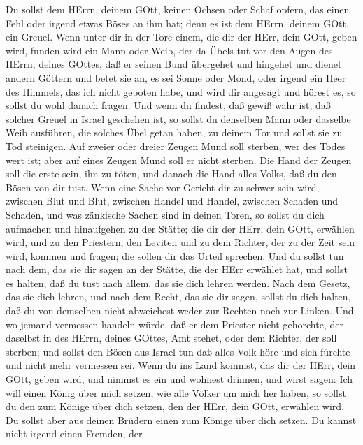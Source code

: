  Du sollst dem HErrn, deinem GOtt, keinen Ochsen oder Schaf
opfern, das einen Fehl oder irgend etwas Böses an ihm hat; denn es ist
dem HErrn, deinem GOtt, ein Greuel.  Wenn unter dir in der
Tore einem, die dir der HErr, dein GOtt, geben wird, funden wird ein
Mann oder Weib, der da Übels tut vor den Augen des HErrn, deines GOttes,
daß er seinen Bund übergehet  und hingehet und dienet andern
Göttern und betet sie an, es sei Sonne oder Mond, oder irgend ein Heer
des Himmels, das ich nicht geboten habe,  und wird dir
angesagt und hörest es, so sollst du wohl danach fragen. Und wenn du
findest, daß gewiß wahr ist, daß solcher Greuel in Israel geschehen ist,
 so sollst du denselben Mann oder dasselbe Weib ausführen,
die solches Übel getan haben, zu deinem Tor und sollst sie zu Tod
steinigen.  Auf zweier oder dreier Zeugen Mund soll sterben,
wer des Todes wert ist; aber auf eines Zeugen Mund soll er nicht
sterben.  Die Hand der Zeugen soll die erste sein, ihn zu
töten, und danach die Hand alles Volks, daß du den Bösen von dir tust.
 Wenn eine Sache vor Gericht dir zu schwer sein wird,
zwischen Blut und Blut, zwischen Handel und Handel, zwischen Schaden und
Schaden, und was zänkische Sachen sind in deinen Toren, so sollst du
dich aufmachen und hinaufgehen zu der Stätte; die dir der HErr, dein
GOtt, erwählen wird,  und zu den Priestern, den Leviten und
zu dem Richter, der zu der Zeit sein wird, kommen und fragen; die sollen
dir das Urteil sprechen.  Und du sollst tun nach dem, das
sie dir sagen an der Stätte, die der HErr erwählet hat, und sollst es
halten, daß du tust nach allem, das sie dich lehren werden.
 Nach dem Gesetz, das sie dich lehren, und nach dem Recht,
das sie dir sagen, sollst du dich halten, daß du von demselben nicht
abweichest weder zur Rechten noch zur Linken.  Und wo
jemand vermessen handeln würde, daß er dem Priester nicht gehorchte, der
daselbst in des HErrn, deines GOttes, Amt stehet, oder dem Richter, der
soll sterben; und sollst den Bösen aus Israel tun  daß
alles Volk höre und sich fürchte und nicht mehr vermessen sei.
 Wenn du ins Land kommst, das dir der HErr, dein GOtt,
geben wird, und nimmst es ein und wohnest drinnen, und wirst sagen: Ich
will einen König über mich setzen, wie alle Völker um mich her haben,
 so sollst du den zum Könige über dich setzen, den der
HErr, dein GOtt, erwählen wird. Du sollst aber aus deinen Brüdern einen
zum Könige über dich setzen. Du kannst nicht irgend einen Fremden, der
